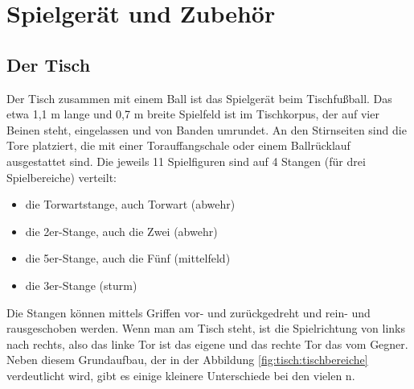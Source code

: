 \chapter{Spielgerät und Zubehör}
\label{tisch}


\section{Der Tisch}
\label{tisch:tisch}

Der Tisch zusammen mit einem Ball ist das Spielgerät beim Tischfußball. 
Das etwa 1,1 m lange und 0,7 m breite Spielfeld ist im Tischkorpus, der auf vier Beinen steht, eingelassen und von Banden umrundet. An den Stirnseiten sind die Tore platziert, die mit einer Torauffangschale oder einem Ballrücklauf ausgestattet sind.  
Die jeweils 11 Spielfiguren sind auf 4 Stangen (für drei Spielbereiche) verteilt:
\begin{itemize}  
    \item die Torwartstange, auch Torwart (\gls{abwehr}) 
    \item die 2er-Stange, auch die Zwei (\gls{abwehr}) 
    \item die 5er-Stange, auch die Fünf (\gls{mittelfeld})
    \item die 3er-Stange (\gls{sturm})
\end{itemize}  
Die Stangen können mittels Griffen vor- und zurückgedreht und rein- und rausgeschoben werden.
Wenn man am Tisch steht, ist die Spielrichtung von links nach rechts, also das linke Tor ist das eigene und das rechte Tor das vom Gegner.
Neben diesem Grundaufbau, der in der Abbildung \ref{fig:tisch:tischbereiche} verdeutlicht wird, gibt es einige kleinere Unterschiede bei den vielen n. 

